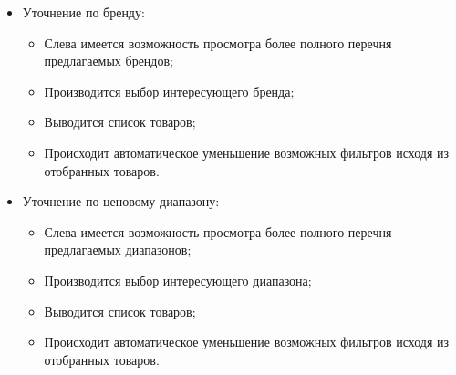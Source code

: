 {\begin{itemize}
\item Уточнение по бренду:

	\begin{itemize}
		\item Слева имеется возможность просмотра более полного перечня предлагаемых брендов;
		\item Производится выбор интересующего бренда;
		\item Выводится список товаров;
		\item Происходит автоматическое уменьшение возможных фильтров исходя из отобранных товаров.
	\end{itemize}

\item Уточнение по ценовому диапазону:

	\begin{itemize}
		\item Слева имеется возможность просмотра более полного перечня предлагаемых диапазонов;
		\item Производится выбор интересующего диапазона;
		\item Выводится список товаров;
		\item Происходит автоматическое уменьшение возможных фильтров исходя из отобранных товаров.
	\end{itemize}

\end{itemize}
}
